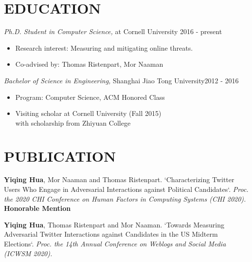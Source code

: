 \documentclass[margin, 10pt]{res} %
\begin{document}
\begin{resume}



\section{EDUCATION}

{\sl Ph.D. Student in Computer Science,} at Cornell University \hfill 2016 - present \\
\begin{itemize}
\item Research interest: Measuring and mitigating online threats.
\item Co-advised by: Thomas Ristenpart, Mor Naaman
\end{itemize}
{\sl Bachelor of Science in Engineering,} Shanghai Jiao Tong University\hfill 2012 - 2016\\
\begin{itemize}
\item Program: Computer Science, ACM Honored Class
\item Visiting scholar at Cornell University (Fall 2015) \\with scholarship from Zhiyuan College
\end{itemize}


\section{PUBLICATION}

\textbf{Yiqing Hua}, Mor Naaman and Thomas Ristenpart.
`Characterizing Twitter Users Who Engage in Adversarial Interactions against Political Candidates`.
\textit{Proc. the 2020 CHI Conference on Human Factors in Computing Systems (CHI 2020).}
\textbf{Honorable Mention}

\textbf{Yiqing Hua}, Thomas Ristenpart and Mor Naaman.
`Towards Measuring Adversarial Twitter Interactions against Candidates in the US Midterm Elections`.   
\textit{Proc. the 14th Annual Conference on Weblogs and Social Media (ICWSM 2020).}


\end{resume}
\end{document}
